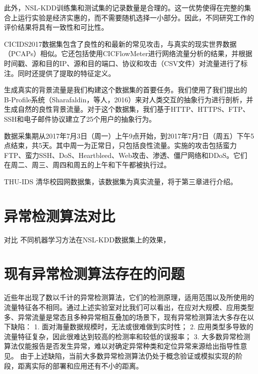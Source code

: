 此外，NSL-KDD训练集和测试集的记录数量是合理的。这一优势使得在完整的集合上运行实验是经济实惠的，而不需要随机选择一小部分。因此，不同研究工作的评价结果将具有一致性和可比性。

CICIDS2017数据集包含了良性的和最新的常见攻击，与真实的现实世界数据（PCAPs）相似。它还包括使用CICFlowMeter进行网络流量分析的结果，并根据时间戳、源和目的IP、源和目的端口、协议和攻击（CSV文件）对流量进行了标注。同时还提供了提取的特征定义。

生成真实的背景流量是我们构建这个数据集的首要任务。我们使用了我们提出的B-Profile系统（Sharafaldin，等人，2016）来对人类交互的抽象行为进行剖析，并生成自然的良性背景流量。对于这个数据集，我们基于HTTP、HTTPS、FTP、SSH和电子邮件协议建立了25个用户的抽象行为。

数据采集期从2017年7月3日（周一）上午9点开始，到2017年7月7日（周五）下午5点结束，共5天。其中周一为正常日，只包括良性流量。实施的攻击包括蛮力FTP、蛮力SSH、DoS、Heartbleed、Web攻击、渗透、僵尸网络和DDoS。它们在周二、周三、周四和周五的上午和下午都被执行过。


THU-IDS 清华校园网数据集，该数据集为真实流量，将于第三章进行介绍。

\section{异常检测算法对比}
对比
不同机器学习方法在NSL-KDD数据集上的效果，
\section{现有异常检测算法存在的问题}
近些年出现了数以千计的异常检测算法，它们的检测原理，适用范围以及所使用的流量特征各不相同。通过上述实验室对比我们可以看出，在应对大规模、应用类型多、异常流量是常态且多种异常相互叠加的场景下，现有异常检测算法大多存在以下缺陷：
1.	面对海量数据规模时，无法或很难做到实时性；
2.	应用类型多导致的流量特征复杂，因此很难达到较高的检测率和较低的误报率；
3.	大多数异常检测算法仅能报告是否发生异常，难以对确定异常种类和定位异常来源给出指导性意见。
由于上述缺陷，当前大多数异常检测算法仍处于概念验证或模拟实现的阶段，距离实际的部署和应用还有不小的距离。
